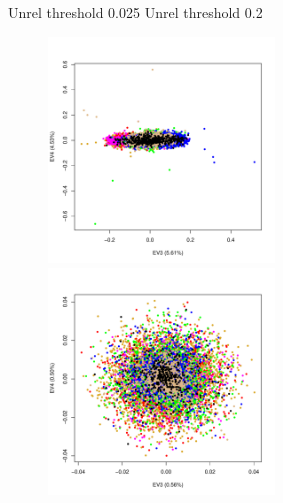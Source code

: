 \documentclass{beamer}
\begin{document}
\begin{frame}
\footnotesize
Unrel threshold 0.025 \hspace{4cm} Unrel threshold 0.2
\centering
\begin{figure}
\includegraphics[height=6cm]{../pca_X_adjXkc_adjAutoXPC15_ev34_col.pdf}
\includegraphics[height=6cm]{../pca_prunedX_adjXkc_adjAutoPC15_xPrunedKC_ev34_col.pdf}
\end{figure}
\end{frame}
\end{document}
